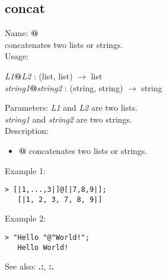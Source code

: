 \subsection{ concat }
\noindent Name: \textbf{@}\\
concatenates two lists or strings.\\

\noindent Usage: 
\begin{center}
\emph{L1}\textbf{@}\emph{L2} : (\textsf{list}, \textsf{list}) $\rightarrow$ \textsf{list}\\
\emph{string1}\textbf{@}\emph{string2} : (\textsf{string}, \textsf{string}) $\rightarrow$ \textsf{string}\\
\end{center}
Parameters: 
\emph{L1} and \emph{L2} are two lists.\\
\emph{string1} and \emph{string2} are two strings.\\

\noindent Description: \begin{itemize}

\item \textbf{@} concatenates two lists or strings.
\end{itemize}
\noindent Example 1: 
\begin{center}\begin{minipage}{14.8cm}\begin{Verbatim}[frame=single]
   > [|1,...,3|]@[|7,8,9|];
   [|1, 2, 3, 7, 8, 9|]
\end{Verbatim}
\end{minipage}\end{center}
\noindent Example 2: 
\begin{center}\begin{minipage}{14.8cm}\begin{Verbatim}[frame=single]
   > "Hello "@"World!";
   Hello World!
\end{Verbatim}
\end{minipage}\end{center}
See also: \textbf{.:}, \textbf{:.}
